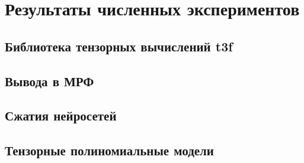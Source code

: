 \chapter{Результаты численных экспериментов} \label{chap:exm}
\section{Библиотека тензорных вычислений t3f} \label{sec:t3f}
\section{Вывода в МРФ} \label{sec:mrf-code}
\section{Сжатия нейросетей} \label{sec:exm-code}
\section{Тензорные полиномиальные модели} \label{sec:nn-code}
